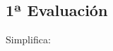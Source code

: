 \documentclass[addpoints,spanish, 12pt,a4paper]{exam}
\begin{document}
        \begin{questions}

\section*{1ª Evaluación}        
        \question[1] Simplifica:
        \begin{multicols}{2}
\end{multicols}
\end{questions}
\end{document}
